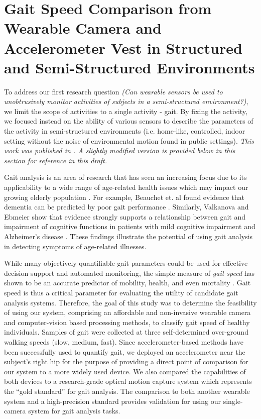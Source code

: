 \documentclass[12pt]{report}
\begin{document}
\section{Gait Speed Comparison from Wearable Camera and Accelerometer Vest in Structured and Semi-Structured Environments}
To address our first research question \emph{(Can wearable sensors be used to unobtrusively monitor activities of subjects in a semi-structured environment?)}, we limit the scope of activities to a single activity - gait. By fixing the activity, we focused instead on the ability of various sensors to describe the parameters of the activity in semi-structured environments (i.e. home-like, controlled, indoor setting without the noise of environmental motion found in public settings). \emph{This work was published in \cite{Schneider2019ComparisonEnvironments}. A slightly modified version is provided below in this section for reference in this draft.}

Gait analysis is an area of research that has seen an increasing focus due to its applicability to a wide range of age-related health issues which may impact our growing elderly population \cite{Ortman2014AnStates}. For example, Beauchet et. al found evidence that dementia can be predicted by poor gait performance \cite{Beauchet2016PoorMeta-Analysis}. Similarly, Valkanova and Ebmeier show that evidence strongly supports a relationship between gait and impairment of cognitive functions in patients with mild cognitive impairment and Alzheimer's disease \cite{Valkanova2017WhatEvidence}. These findings illustrate the potential of using gait analysis in detecting symptoms of age-related illnesses.

While many objectively quantifiable gait parameters could be used for effective decision support and automated monitoring, the simple measure of \textit{gait speed} has shown to be an accurate predictor of mobility, health, and even mortality \cite{Afilalo2010GaitSurgery, Viccaro2011GaitForce, Fitzpatrick2007AssociationsPersons}. Gait speed is thus a critical parameter for evaluating the utility of candidate gait analysis systems. Therefore, the goal of this study was to determine the feasibility of using our system, comprising an affordable and non-invasive wearable camera and computer-vision based processing methods, to classify gait speed of healthy individuals. Samples of gait were collected at three self-determined over-ground walking speeds (slow, medium, fast). Since accelerometer-based methods have been successfully used to quantify gait, we deployed an accelerometer near the subject's right hip for the purpose of providing a direct point of comparison for our system to a more widely used device. We also compared the capabilities of both devices to a research-grade optical motion capture system which represents the ``gold standard'' for gait analysis. The comparison to both another wearable system and a high-precision standard provides validation for using our single-camera system for gait analysis tasks.
\end{document}
